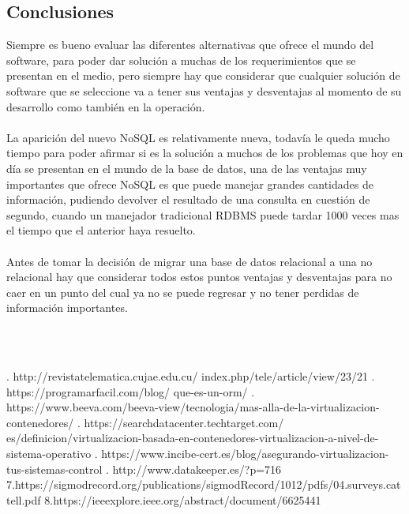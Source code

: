 \documentclass[twoside,twocolumn]{article}
\begin{document}
\begin{flushright}
\begin{itemize}
\section{Conclusiones}
Siempre es bueno evaluar las diferentes alternativas que ofrece el mundo del software, para poder dar solución a muchas de los requerimientos que se presentan en el medio, pero siempre hay que considerar que cualquier solución de software que se seleccione va a tener sus ventajas y desventajas al momento de su desarrollo como también en la operación.\textbf{}\\
\textbf{}\\
La aparición del nuevo NoSQL es relativamente nueva, todavía le queda mucho tiempo para poder afirmar si es la solución a muchos de los problemas que hoy en día se presentan en el mundo de la base de datos, una de las ventajas muy importantes que ofrece NoSQL es que puede manejar grandes cantidades de información, pudiendo devolver el resultado de una consulta en cuestión de segundo, cuando un manejador tradicional RDBMS puede tardar 1000 veces mas el tiempo que el anterior haya resuelto. \textbf{}\\
\textbf{}\\
Antes de tomar la decisión de migrar una base de datos relacional a una no relacional hay que considerar todos estos puntos ventajas y desventajas para no caer en un punto del cual ya no se puede regresar y no tener perdidas de información importantes.




\textbf{}\\
\textbf{}\\

\begin{thebibliography}{99} %



. http://revistatelematica.cujae.edu.cu/
index.php/tele/article/view/23/21
 \break
{}. https://programarfacil.com/blog/
que-es-un-orm/
\break
{}. https://www.beeva.com/beeva-view/tecnologia/mas-alla-de-la-virtualizacion-contenedores/
\break
{}. https://searchdatacenter.techtarget.com/
es/definicion/virtualizacion-basada-en-contenedores-virtualizacion-a-nivel-de-sistema-operativo
\break
{}. https://www.incibe-cert.es/blog/asegurando-virtualizacion-tus-sistemas-control
\break
{}. http://www.datakeeper.es/?p=716
\break
\newblock
7.https://sigmodrecord.org/publications/sigmodRecord/1012/pdfs/04.surveys.cattell.pdf
\break
\newblock
8.https://ieeexplore.ieee.org/abstract/document/6625441
\break
\newblock {\em }
 
\end{thebibliography}

\end{itemize}
\end{flushright}
\end{document}
